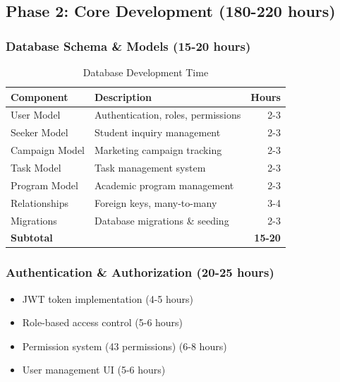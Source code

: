 \documentclass[11pt,a4paper]{article}
\begin{document}
\newpage

\subsection{Phase 2: Core Development (180-220 hours)}

\subsubsection{Database Schema \& Models (15-20 hours)}
\begin{table}[h]
\centering
\begin{tabular}{llr}
\toprule
\textbf{Component} & \textbf{Description} & \textbf{Hours} \\
\midrule
User Model & Authentication, roles, permissions & 2-3 \\
Seeker Model & Student inquiry management & 2-3 \\
Campaign Model & Marketing campaign tracking & 2-3 \\
Task Model & Task management system & 2-3 \\
Program Model & Academic program management & 2-3 \\
Relationships & Foreign keys, many-to-many & 3-4 \\
Migrations & Database migrations \& seeding & 2-3 \\
\bottomrule
\textbf{Subtotal} & & \textbf{15-20} \\
\bottomrule
\end{tabular}
\caption{Database Development Time}
\end{table}

\subsubsection{Authentication \& Authorization (20-25 hours)}
\begin{itemize}
    \item JWT token implementation (4-5 hours)
    \item Role-based access control (5-6 hours)
    \item Permission system (43 permissions) (6-8 hours)
    \item User management UI (5-6 hours)
\end{itemize}
\end{document}
